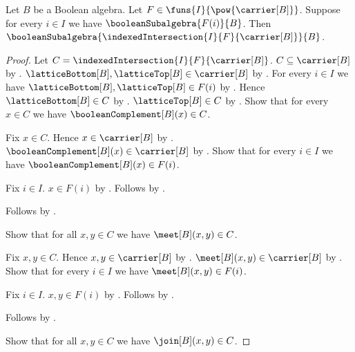 \begin{theorem}\label{boolean_subalgebra_indexed_intersection}
    Let $B$ be a Boolean algebra.
    Let $F\in\funs{I}{\pow{\carrier[B]}}$.
    Suppose for every $i\in I$ we have
        $\booleanSubalgebra{F(i)}{B}$.
    Then $\booleanSubalgebra{
        \indexedIntersection{I}{F}{\carrier[B]}}{B}$.
\end{theorem}
\begin{proof}
    Let $C=\indexedIntersection{I}{F}{\carrier[B]}$.
    $C\subseteq\carrier[B]$ by .
    $\latticeBottom[B],\latticeTop[B]\in\carrier[B]$ by
        .
    For every $i\in I$ we have
        $\latticeBottom[B],\latticeTop[B]\in F(i)$ by
        .
    Hence $\latticeBottom[B]\in C$ by
        .
    $\latticeTop[B]\in C$ by
        .
    Show that for every $x\in C$ we have
        $\booleanComplement[B](x)\in C$.
    \begin{subproof}
        Fix $x\in C$.
        Hence $x\in\carrier[B]$ by .
        $\booleanComplement[B](x)\in\carrier[B]$ by
            .
        Show that for every $i\in I$ we have
            $\booleanComplement[B](x)\in F(i)$.
        \begin{subproof}
            Fix $i\in I$.
            $x\in F(i)$ by .
            Follows by .
        \end{subproof}
        Follows by .
    \end{subproof}
    Show that for all $x,y\in C$ we have $\meet[B](x,y)\in C$.
    \begin{subproof}
        Fix $x,y\in C$.
        Hence $x,y\in\carrier[B]$ by .
        $\meet[B](x,y)\in\carrier[B]$ by
            .
        Show that for every $i\in I$ we have $\meet[B](x,y)\in F(i)$.
        \begin{subproof}
            Fix $i\in I$.
            $x,y\in F(i)$ by .
            Follows by .
        \end{subproof}
        Follows by .
    \end{subproof}
    Show that for all $x,y\in C$ we have $\join[B](x,y)\in C$.

\end{proof}
